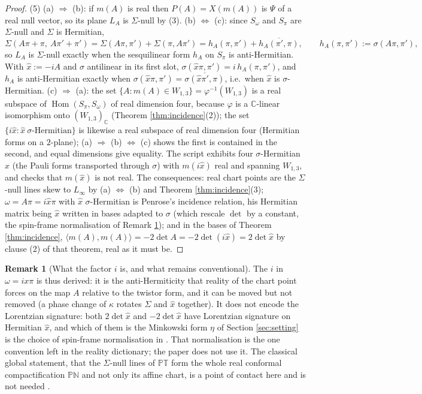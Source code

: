 \documentclass[11pt]{article}
\theoremstyle{definition}
\newtheorem{remark}[theorem]{Remark}
\newcommand{\C}{\mathbb{C}}
\newcommand{\PT}{\mathbb{PT}}
\newcommand{\ip}[2]{\langle #1, #2\rangle}
\newcommand{\Som}{S_\omega}
\newcommand{\Spi}{S_\pi}
\begin{document}
\begin{proof}
(5) (a) $\Rightarrow$ (b): if $m(A)$ is real then $P(A) = X(m(A))$ is $\Psi$ of a real null vector, so its plane $L_A$ is $\Sigma$-null by (3). (b) $\Leftrightarrow$ (c): since $\Som$ and $\Spi$ are $\Sigma$-null and $\Sigma$ is Hermitian,
\[
\Sigma(A\pi + \pi,\ A\pi' + \pi') = \Sigma(A\pi, \pi') + \Sigma(\pi, A\pi') = h_A(\pi,\pi') + \overline{h_A(\pi',\pi)}, \qquad h_A(\pi,\pi') := \sigma(A\pi, \pi'),
\]
so $L_A$ is $\Sigma$-null exactly when the sesquilinear form $h_A$ on $\Spi$ is anti-Hermitian. With $\hat x := -iA$ and $\sigma$ antilinear in its first slot, $\sigma(\hat x\pi, \pi') = i\,h_A(\pi,\pi')$, and $h_A$ is anti-Hermitian exactly when $\sigma(\hat x\pi,\pi') = \overline{\sigma(\hat x\pi',\pi)}$, i.e.\ when $\hat x$ is $\sigma$-Hermitian. (c) $\Rightarrow$ (a): the set $\{A : m(A) \in W_{1,3}\} = \varphi^{-1}(W_{1,3})$ is a real subspace of $\operatorname{Hom}(\Spi,\Som)$ of real dimension four, because $\varphi$ is a $\C$-linear isomorphism onto $(W_{1,3})_\C$ (Theorem \ref{thm:incidence}(2)); the set $\{i\hat x : \hat x\ \sigma\text{-Hermitian}\}$ is likewise a real subspace of real dimension four (Hermitian forms on a $2$-plane); (a) $\Rightarrow$ (b) $\Leftrightarrow$ (c) shows the first is contained in the second, and equal dimensions give equality. The script exhibits four $\sigma$-Hermitian $\hat x$ (the Pauli forms transported through $\sigma$) with $m(i\hat x)$ real and spanning $W_{1,3}$, and checks that $m(\hat x)$ is not real. The consequences: real chart points are the $\Sigma$-null lines skew to $L_\infty$ by (a) $\Leftrightarrow$ (b) and Theorem \ref{thm:incidence}(3); $\omega = A\pi = i\hat x\pi$ with $\hat x$ $\sigma$-Hermitian is Penrose's incidence relation, his Hermitian matrix being $\hat x$ written in bases adapted to $\sigma$ (which rescale $\det$ by a constant, the spin-frame normalisation of Remark \ref{rem:factori}); and in the bases of Theorem \ref{thm:incidence}, $\ip{m(A)}{m(A)} = -2\det A = -2\det(i\hat x) = 2\det\hat x$ by clause (2) of that theorem, real as it must be.
\end{proof}

\begin{remark}[What the factor $i$ is, and what remains conventional]\label{rem:factori}
The $i$ in $\omega = ix\pi$ is thus derived: it is the anti-Hermiticity that reality of the chart point forces on the map $A$ relative to the twistor form, and it can be moved but not removed (a phase change of $\kappa$ rotates $\Sigma$ and $\hat x$ together). It does not encode the Lorentzian signature: both $2\det\hat x$ and $-2\det\hat x$ have Lorentzian signature on Hermitian $\hat x$, and which of them is the Minkowski form $\eta$ of Section \ref{sec:setting} is the choice of spin-frame normalisation in \cite{PenroseRindler86}. That normalisation is the one convention left in the reality dictionary; the paper does not use it. The classical global statement, that the $\Sigma$-null lines of $\PT$ form the whole real conformal compactification $\mathbb{PN}$ and not only its affine chart, is a point of contact here and is not needed \cite{Penrose1967, PenroseRindler86}.
\end{remark}
\end{document}
